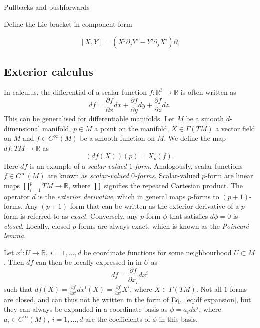 Pullbacks and pushforwards

Define the Lie bracket in component form

\begin{equation} \label{eq:lie bracket in component form}
[X, Y] = (X^j \partial_j Y^i - Y^j \partial_j X^i) \partial_i
\end{equation}

\subsection{Exterior calculus} \label{sec:Exterior calculus}

In calculus, the differential of a scalar function $f : \mathbb{R}^3 \to \mathbb{R}$ is often written as
\begin{equation}
df = \frac{\partial f}{\partial x} d x + \frac{\partial f}{\partial y} d y + \frac{\partial f}{\partial z} d z.
\end{equation}
This can be generalised for differentiable manifolds. Let $M$ be a smooth $d$-dimensional manifold, $p \in M$ a point on the manifold, $X \in \Gamma(TM)$ a vector field on $M$ and $f \in C^\infty(M)$ be a smooth function on $M$. We define the map $df : TM \to \mathbb{R}$ as
\begin{equation} \label{eq:df action}
(df(X))(p) = X_p(f).
\end{equation}
Here $df$ is an example of a \textit{scalar-valued $1$-form}. Analogously, scalar functions $f \in C^\infty(M)$ are known as \textit{scalar-valued $0$-forms}. Scalar-valued $p$-form are linear maps $\prod_{i=1}^p TM \to \mathbb{R}$, where $\prod$ signifies the repeated Cartesian product. The operator $d$ is the \textit{exterior derivative}, which in general maps $p$-forms to $(p+1)$-forms. Any $(p+1)$-form that can be written as the exterior derivative of a $p$-form is referred to as \textit{exact}. Conversely, any $p$-form $\phi$ that satisfies $d \phi = 0$ is \textit{closed}. Locally, closed $p$-forms are always exact, which is known as the \textit{Poincaré lemma}. 
 
Let $x^i : U \to \mathbb{R},\ i=1,\dots,d$ be coordinate functions for some neighbourhood $U \subset M$. Then $df$ can then be locally expressed in in $U$ as
\begin{equation} \label{eq:df expansion}
df = \frac{\partial f}{\partial x_i} d x^i
\end{equation}
such that $df(X) = \frac{\partial f}{\partial x^i} dx^i(X) = \frac{\partial f}{\partial x^i} X^i$, where $X \in \Gamma(TM)$. Not all $1$-forms are closed, and can thus not be written in the form of Eq.~\ref{eq:df expansion}, but they can always be expanded in a coordinate basis as $\phi = a_i dx^i$, where $a_i \in C^\infty(M),\ i=1,\dots,d$ are the coefficients of $\phi$ in this basis.

